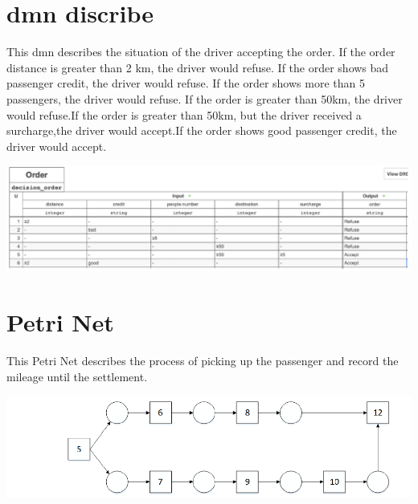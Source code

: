 \documentclass[runningheads]{llncs}
\begin{document}
\section{dmn discribe}
This dmn describes the situation of the driver accepting the order. If the order distance is greater than 2 km, the driver would refuse. If the order shows bad passenger credit, the driver would refuse. If the order shows more than 5 passengers, the driver would refuse. If the order is greater than 50km, the driver would refuse.If the order is greater than 50km, but the driver received a surcharge,the driver would accept.If the order shows good passenger credit, the driver would accept.\\

\centerline{\includegraphics[scale=0.8]{driver_dmn_127.png}}


\section{Petri Net}
This Petri Net describes the process of picking up the passenger and record the mileage until the settlement.\\

\centerline{\includegraphics[scale=0.9]{driver_PN_127.png}}
\end{document}
